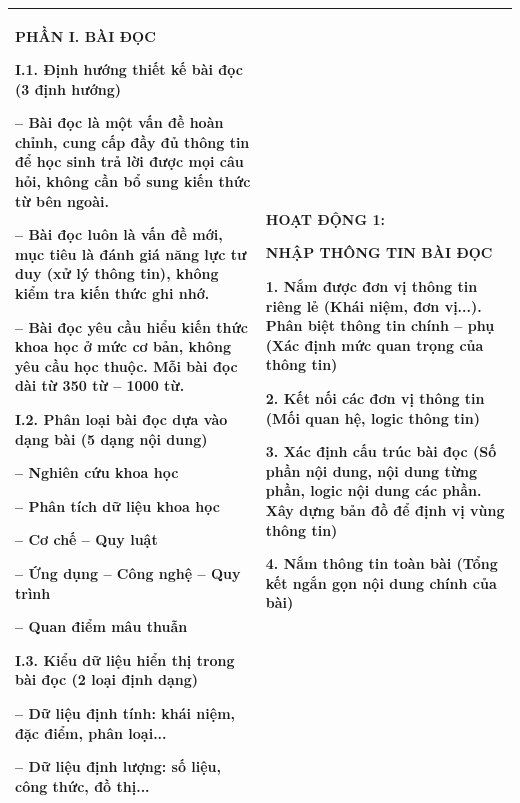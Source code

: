 \documentclass[12pt,a4paper,twoside]{article}
\begin{document}
{\begin{longtable}{|>{\raggedright\arraybackslash}p{}|>{\raggedright\arraybackslash}p{}|}
\textbf{\textcolor{primaryBlue}{PHẦN I. BÀI ĐỌC}}\par\vspace{2pt}
\textbf{I.1. Định hướng thiết kế bài đọc} (3 định hướng)\par
-- Bài đọc là \textbf{một vấn đề hoàn chỉnh}, cung cấp đầy đủ thông tin để học sinh trả lời được mọi câu hỏi, không cần bổ sung kiến thức từ bên ngoài.\par
-- Bài đọc luôn là vấn đề mới, mục tiêu là \textbf{đánh giá năng lực tư duy} (xử lý thông tin), không kiểm tra kiến thức ghi nhớ.\par
-- Bài đọc yêu cầu hiểu kiến thức khoa học ở mức cơ bản, không yêu cầu học thuộc. Mỗi bài đọc dài từ 350 từ -- 1000 từ.\par\vspace{2pt}
\textbf{I.2. Phân loại bài đọc dựa vào dạng bài} (5 dạng nội dung)\par
-- Nghiên cứu khoa học\par
-- Phân tích dữ liệu khoa học\par
-- Cơ chế -- Quy luật\par
-- Ứng dụng -- Công nghệ -- Quy trình\par
-- Quan điểm mâu thuẫn\par\vspace{2pt}
\textbf{I.3. Kiểu dữ liệu} hiển thị trong bài đọc (2 loại định dạng)\par
-- Dữ liệu định tính: khái niệm, đặc điểm, phân loại...\par
-- Dữ liệu định lượng: số liệu, công thức, đồ thị...
&
\textbf{\textcolor{sectionMid}{HOẠT ĐỘNG 1:}}\par
\textbf{\textcolor{sectionMid}{NHẬP THÔNG TIN BÀI ĐỌC}}\par\vspace{2pt}
\textbf{1. Nắm} được \textbf{đơn vị thông tin riêng lẻ} (Khái niệm, đơn vị...). \textbf{Phân biệt thông tin chính -- phụ} (Xác định mức quan trọng của thông tin)\par
\textbf{2. Kết nối các đơn vị thông tin} (Mối quan hệ, logic thông tin)\par
\textbf{3. Xác định cấu trúc bài đọc} (Số phần nội dung, nội dung từng phần, logic nội dung các phần. Xây dựng bản đồ để định vị vùng thông tin)\par
\textbf{4. Nắm thông tin toàn bài} (Tổng kết ngắn gọn nội dung chính của bài)
\\
\hline


\end{longtable}}
\end{document}
